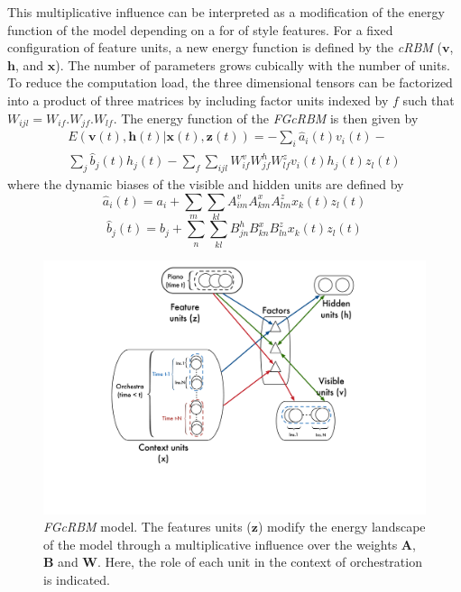 \documentclass{article}
\begin{document}
This multiplicative influence can be interpreted as a modification of the energy function of the model depending on a for of style features. For a fixed configuration of feature units, a new energy function is defined by the \textit{cRBM} ($\bm{v}$, $\bm{h}$, and $\bm{x}$). The number of parameters grows cubically with the number of units. To reduce the computation load, the three dimensional tensors can be factorized into a product of three matrices by including factor units indexed by $f$ such that $W_{ijl} = W_{if} . W_{jf} . W_{lf}$.
The energy function of the \textit{FGcRBM} is then given by
\begin{equation}
\begin{split}
E(\bm{v}(t),\bm{h}(t)|\bm{x}(t),\bm{z}(t)) = - \sum_{i} \hat{a}_{i}(t)v_{i}(t) - \\ \sum_{j} \hat{b}_{j}(t)h_{j}(t)
-\sum_{f}\sum_{ijl} W_{if}^{v} W_{jf}^{h} W_{lf}^{z} v_{i}(t) h_{j}(t) z_{l}(t) 
\end{split}
\end{equation}
where the dynamic biases of the visible and hidden units are defined by
\begin{equation}
\hat{a}_{i}(t) = a_{i} + \sum_{m} \sum_{kl}A_{im}^{v}A_{km}^{x}A_{lm}^{z}x_{k}(t)z_{l}(t)
\end{equation}
\begin{equation}
\hat{b}_{j}(t) = b_{j} + \sum_{n} \sum_{kl}B_{jn}^{h}B_{kn}^{x}B_{ln}^{z}x_{k}(t)z_{l}(t)
\end{equation}

\begin{figure}[ht]
\centering
\includegraphics[scale=0.20]{FGcRBM_orchestration}
\caption{\textit{FGcRBM} model. The features units ($\bm{z}$) modify the energy landscape of the model through a multiplicative influence over the weights $\bm{A}$, $\bm{B}$ and $\bm{W}$. Here, the role of each unit in the context of orchestration is indicated.}
\label{fig:FGcRBM}
\end{figure}
\end{document}
